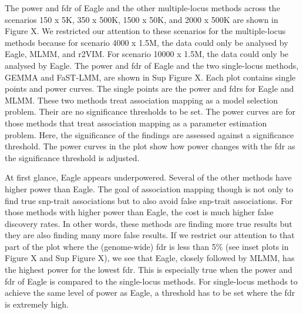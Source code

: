 \documentclass{nature}
\begin{document}
The power and fdr of Eagle and the other multiple-locus methods across the scenarios 150 x 5K, 350 x 500K, 1500 x 50K, and 2000 x 500K are shown in Figure X.  We restricted our attention to these scenarios for the multiple-locus methods because for scenario 4000 x 1.5M, 
the data could only be analysed by Eagle, MLMM, and r2VIM. For scenario 10000 x 1.5M, the data could only be analysed by Eagle. 
The power and fdr of Eagle and the two single-locus methods, GEMMA and FaST-LMM,  are shown in Sup Figure X.  Each plot contains 
single points and power curves. The single points are the power and fdrs for Eagle and MLMM.
These two methods treat association mapping as a model selection problem. Their are no significance thresholds to be set. 
The power curves are for those methods that treat association mapping as a parameter estimation problem. Here, the 
significance of the findings are assessed against a significance threshold. The power curves in the plot show how power changes with 
the fdr as the significance threshold  is adjusted. 

At first glance, Eagle appears underpowered. Several of the other methods have higher power than Eagle. The goal of association 
mapping though is not only to find true snp-trait associations but to also avoid false snp-trait associations. For those methods with higher power than Eagle, the cost is much higher false discovery rates. In other words, these methods are finding more true results 
but they are also finding many more false results. If we restrict our attention to that part of the plot where the (genome-wide) fdr is less than 
5\% (see inset plots in Figure X and Sup Figure X),  we see that Eagle, closely followed by MLMM,  has the highest power for the lowest 
fdr. This is especially true when the power and fdr of Eagle is compared to the single-locus methods. For single-locus methods to achieve the same level of power as Eagle, a threshold has to be set where the fdr is extremely high. 
\end{document}
